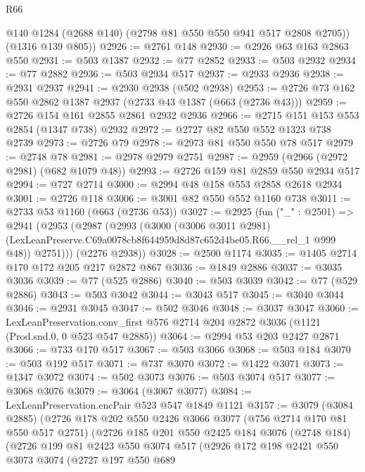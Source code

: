 \begin{lexlean}{R66}
\begin{coremodule}
        @140
        @1284
        (@2688 @140)
        (@2798 @81 @550 @550 @941 @517 @2808 @2705))
      (@1316 @139 @805))
@2926 := @2761 @148
@2930 := @2926 @63 @163 @2863 @550
@2931 := @503 @1387
@2932 := @77 @2852
@2933 := @503 @2932
@2934 := @77 @2882
@2936 := @503 @2934 @517
@2937 := @2933 @2936
@2938 := @2931 @2937
@2941 := @2930 @2938 (@502 @2938)
@2953 := @2726 @73 @162 @550 @2862 @1387 @2937 (@2733 @43 @1387 (@663 (@2736 @43)))
@2959 := @2726 @154 @161 @2855 @2861 @2932 @2936
@2966 := @2715 @151 @153 @553 @2854 (@1347 @738) @2932
@2972 := @2727 @82 @550 @552 @1323 @738 @2739
@2973 := @2726 @79
@2978 := @2973 @81 @550 @550 @78 @517
@2979 := @2748 @78
@2981 := @2978 @2979 @2751
@2987 := @2959 (@2966 (@2972 @2981) (@682 @1079 @48))
@2993 := @2726 @159 @81 @2859 @550 @2934 @517
@2994 := @727 @2714
@3000 := @2994 @48 @158 @553 @2858 @2618 @2934
@3001 := @2726 @118
@3006 := @3001 @82 @550 @552 @1160 @738
@3011 := @2733 @53 @1160 (@663 (@2736 @53))
@3027 := @2925
    (fun ("_" : @2501) =>
    @2941
      (@2953
        (@2987
          (@2993
            (@3000
              (@3006 @3011 @2981)
              (LexLeanPreserve.C69a0078cb8f644959d8d87c652d4be05.R66.__rel_1 @999 @48))
            @2751)))
      (@2276 @2938))
@3028 := @2500 @1174
@3035 := @1405 @2714 @170 @172 @205 @217 @2872 @867
@3036 := @1849 @2886
@3037 := @3035 @3036
@3039 := @77 (@525 @2886)
@3040 := @503 @3039
@3042 := @77 (@529 @2886)
@3043 := @503 @3042
@3044 := @3043 @517
@3045 := @3040 @3044
@3046 := @2931 @3045
@3047 := @502 @3046
@3048 := @3037 @3047
@3060 := LexLeanPreservation.conv_first
    @576
    @2714
    @204
    @2872
    @3036
    (@1121 (Prod.snd.{0, 0} @523 @547 @2885))
@3064 := @2994 @53 @203 @2427 @2871
@3066 := @733 @170 @517
@3067 := @503 @3066
@3068 := @503 @184
@3070 := @503 @192 @517
@3071 := @737 @3070
@3072 := @1422 @3071
@3073 := @1347 @3072
@3074 := @502 @3073
@3076 := @503 @3074 @517
@3077 := @3068 @3076
@3079 := @3064 (@3067 @3077)
@3084 := LexLeanPreservation.encPair @523 @547 @1849 @1121
@3157 := @3079
    (@3084 @2885)
    (@2726
      @178
      @202
      @550
      @2426
      @3066
      @3077
      (@756 @2714 @170 @81 @550 @517 @2751)
      (@2726
        @185
        @201
        @550
        @2425
        @184
        @3076
        (@2748 @184)
        (@2726
          @199
          @81
          @2423
          @550
          @3074
          @517
          (@2926
            @172
            @198
            @2421
            @550
            @3073
            @3074
            (@2727
              @197
              @550
              @689

\end{coremodule}
\end{lexlean}
